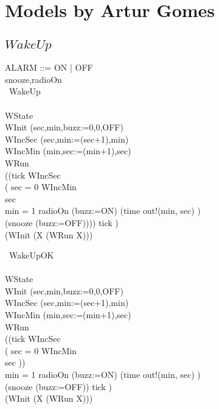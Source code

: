 \section{Models by Artur Gomes}

\subsection{$WakeUp$}

\begin{circus}
ALARM ::= ON | OFF\\
\circchannel snooze,radioOn\\

\circprocess\ WakeUp \circdef\\
\circbegin\\
\circstate WState \\
WInit \circdef (sec,min,buzz:=0,0,OFF)\\
WIncSec \circdef (sec,min:=(sec+1),min)\\
WIncMin \circdef (min,sec:=(min+1),sec)\\
WRun \circdef \\
((tick \then WIncSec \circseq \\
		( \lcircguard sec = 0 \rcircguard \circguard WIncMin\\
		\extchoice \lcircguard sec  \rcircguard \circguard \Skip\\
		\extchoice \lcircguard min = 1 \rcircguard \circguard radioOn \then (buzz:=ON)
		\extchoice (time \then out!(min, sec) \then \Skip)\\
		\extchoice (snooze \then (buzz:=OFF)))) \circhide \lchanset tick \rchanset)
\\
\circspot (WInit \circseq (\circmu X \circspot (WRun \circseq X)))\\
\circend
\end{circus}
\begin{circus}

  \circprocess\ WakeUpOK \circdef\\
  \circbegin\\
  \circstate WState \\
  WInit \circdef (sec,min,buzz:=0,0,OFF)\\
  WIncSec \circdef (sec,min:=(sec+1),min)\\
  WIncMin \circdef (min,sec:=(min+1),sec)\\
  WRun \circdef \\
  ((tick \then WIncSec \circseq \\
  		( \lcircguard sec = 0 \rcircguard \circguard WIncMin\\
  		\extchoice \lcircguard sec  \rcircguard \circguard \Skip))\\
  		\extchoice \lcircguard min = 1 \rcircguard \circguard radioOn \then (buzz:=ON)
  		\extchoice (time \then out!(min, sec) \then \Skip)\\
  		\extchoice (snooze \then (buzz:=OFF)) \circhide \lchanset tick \rchanset)
  \\
  \circspot (WInit \circseq (\circmu X \circspot (WRun \circseq X)))\\
  \circend
\end{circus}
